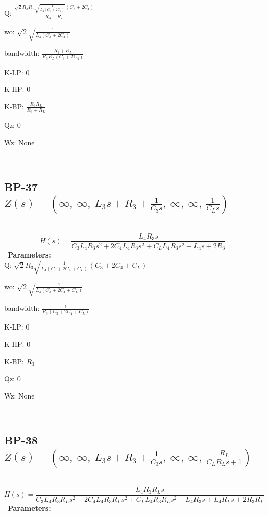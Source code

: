 \documentclass{article}
\begin{document}
Q: $\frac{\sqrt{2} R_{3} R_{L} \sqrt{\frac{1}{L_{4} \left(C_{3} + 2 C_{4}\right)}} \left(C_{3} + 2 C_{4}\right)}{R_{3} + R_{L}}$\ 

wo: $\sqrt{2} \sqrt{\frac{1}{L_{4} \left(C_{3} + 2 C_{4}\right)}}$\ 

bandwidth: $\frac{R_{3} + R_{L}}{R_{3} R_{L} \left(C_{3} + 2 C_{4}\right)}$\ 

K-LP: $0$\ 

K-HP: $0$\ 

K-BP: $\frac{R_{3} R_{L}}{R_{3} + R_{L}}$\ 

Qz: $0$\ 

Wz: $\text{None}$\ 

\ 

\subsection{BP-37 $Z(s) = \left( \infty, \  \infty, \  L_{3} s + R_{3} + \frac{1}{C_{3} s}, \  \infty, \  \infty, \  \frac{1}{C_{L} s}\right)$ } \ 
\textbf{\[H(s) = \frac{L_{4} R_{3} s}{C_{3} L_{4} R_{3} s^{2} + 2 C_{4} L_{4} R_{3} s^{2} + C_{L} L_{4} R_{3} s^{2} + L_{4} s + 2 R_{3}}\] } \ 
\textbf{Parameters:}\\ 

Q: $\sqrt{2} R_{3} \sqrt{\frac{1}{L_{4} \left(C_{3} + 2 C_{4} + C_{L}\right)}} \left(C_{3} + 2 C_{4} + C_{L}\right)$\ 

wo: $\sqrt{2} \sqrt{\frac{1}{L_{4} \left(C_{3} + 2 C_{4} + C_{L}\right)}}$\ 

bandwidth: $\frac{1}{R_{3} \left(C_{3} + 2 C_{4} + C_{L}\right)}$\ 

K-LP: $0$\ 

K-HP: $0$\ 

K-BP: $R_{3}$\ 

Qz: $0$\ 

Wz: $\text{None}$\ 

\ 

\subsection{BP-38 $Z(s) = \left( \infty, \  \infty, \  L_{3} s + R_{3} + \frac{1}{C_{3} s}, \  \infty, \  \infty, \  \frac{R_{L}}{C_{L} R_{L} s + 1}\right)$ } \ 
\textbf{\[H(s) = \frac{L_{4} R_{3} R_{L} s}{C_{3} L_{4} R_{3} R_{L} s^{2} + 2 C_{4} L_{4} R_{3} R_{L} s^{2} + C_{L} L_{4} R_{3} R_{L} s^{2} + L_{4} R_{3} s + L_{4} R_{L} s + 2 R_{3} R_{L}}\] } \ 
\textbf{Parameters:}\\ 
\end{document}

